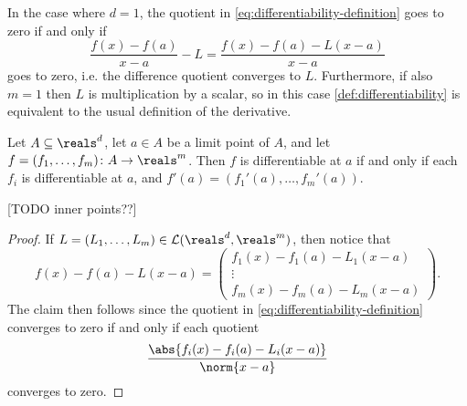 \documentclass[article, a4paper, 11pt, oneside]{memoir}
\numberwithin{equation}{chapter}
\newcommand{\calL}{\mathcal{L}}
\begin{document}
\begin{remarkbreak}
    In the case where $d = 1$, the quotient in \cref{eq:differentiability-definition} goes to zero if and only if
    \begin{equation*}
        \frac{f(x) - f(a)}{x - a} - L
            = \frac{f(x) - f(a) - L(x-a)}{x - a}
    \end{equation*}
    goes to zero, i.e. the difference quotient converges to $L$. Furthermore, if also $m = 1$ then $L$ is multiplication by a scalar, so in this case \cref{def:differentiability} is equivalent to the usual definition of the derivative.
\end{remarkbreak}


\begin{lemma}
    \label{lem:differentiability-coordinate-functions}
    Let $A \subseteq \reals^d$, let $a \in A$ be a limit point of $A$, and let $f = (f_1, \ldots, f_m) \colon A \to \reals^m$. Then $f$ is differentiable at $a$ if and only if each $f_i$ is differentiable at $a$, and $f'(a) = (f_1'(a), \ldots, f_m'(a))$.

    [TODO inner points??]
\end{lemma}

\begin{proof}
    If $L = (L_1, \ldots, L_m) \in \calL(\reals^d,\reals^m)$, then notice that
    \begin{equation*}
        f(x) - f(a) - L(x-a) =
        \begin{pmatrix}
            f_1(x) - f_1(a) - L_1(x-a) \\
            \vdots \\
            f_m(x) - f_m(a) - L_m(x-a)
        \end{pmatrix}.
    \end{equation*}
    The claim then follows since the quotient in \cref{eq:differentiability-definition} converges to zero if and only if each quotient
    \begin{equation*}
        \frac{\abs{f_i(x) - f_i(a) - L_i(x-a)}}{\norm{x - a}}
    \end{equation*}
    converges to zero.
\end{proof}

\newcommand{\trans}{^{\top}}
\end{document}
